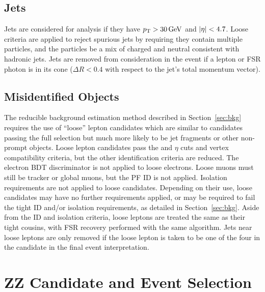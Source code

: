 \subsection{Jets}

Jets are considered for analysis if they have $p_\mathrm{T} > 30\,\mathrm{Ge\hspace{-.08em}V}$ and $\lvert \eta \rvert < 4.7$.
Loose criteria are applied to reject spurious jets by requiring they contain multiple particles, and the particles be a mix of charged and neutral consistent with hadronic jets.
Jets are removed from consideration in the event if a lepton or FSR photon is in its cone ($\Delta R < 0.4$ with respect to the jet's total momentum vector).


\subsection{Misidentified Objects}\label{sec:looseID}

The reducible background estimation method described in Section~\ref{sec:bkg} requires the use of ``loose'' lepton candidates which are similar to candidates passing the full selection but much more likely to be jet fragments or other non-prompt objects.
Loose lepton candidates pass the {\pt} and $\eta$ cuts and vertex compatibility criteria, but the other identification criteria are reduced.
The electron BDT discriminator is not applied to loose electrons.
Loose muons must still be tracker or global muons, but the PF ID is not applied.
Isolation requirements are not applied to loose candidates.
Depending on their use, loose candidates may have no further requirements applied, or may be required to fail the tight ID and/or isolation requirements, as detailed in Section~\ref{sec:bkg}.
Aside from the ID and isolation criteria, loose leptons are treated the same as their tight cousins, with FSR recovery performed with the same algorithm.
Jets near loose leptons are only removed if the loose lepton is taken to be one of the four in the {\ZZ} candidate in the final event interpretation.



\section{ZZ Candidate and Event Selection}

